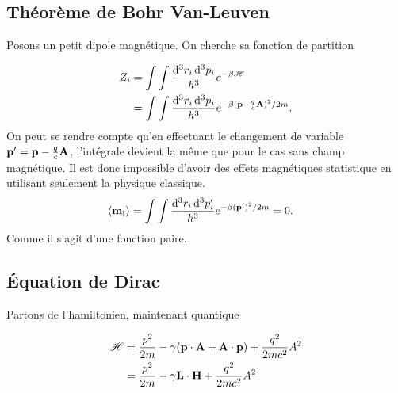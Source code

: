 
\subsection{Théorème de Bohr Van-Leuven} %
\label{sub:Théorème de Bohr Van-Leuven}

Posons un petit dipole magnétique. On cherche sa fonction de partition

\begin{align}
    Z_i&=\int\int\frac{\dd[3]{r_i}\dd[3]{p_i}}{h^3}e^{-\beta \mathscr{H}}\\
       &=\int\int\frac{\dd[3]{r_i}\dd[3]{p_i}}{h^3}e^{-\beta (\vb{p}-\frac qc\vb{A})^2/2m}.
\end{align}
On peut se rendre compte qu'en effectuant le changement de variable $\vb{p'}=\vb{p}-\frac qc\vb{A}$,
l'intégrale devient la même que pour le cas sans champ magnétique. Il est donc
impossible d'avoir des effets magnétiques statistique en utilisant seulement
la physique classique.
\begin{align}
    \expval{\vb{m_i}}&=
       \int\int\frac{\dd[3]{r_i}\dd[3]{p_i'}}{h^3}e^{-\beta (\vb{p'})^2/2m} = 0.
\end{align}
Comme il s'agit d'une fonction paire.


\subsection{Équation de Dirac} %
\label{sub:Équation de Dirac}

Partons de l'hamiltonien, maintenant quantique

\begin{align}
    \mathscr{H}&=\frac{p^2}{2m}-\gamma\qty(\vb{p}\cdot\vb{A}+\vb{A}\cdot\vb{p})
    +\frac{q^2}{2mc^2}A^2\\
               &=\frac{p^2}{2m}-\gamma\vb{L}\cdot\vb{H}+\frac{q^2}{2mc^2}A^2
\end{align}



